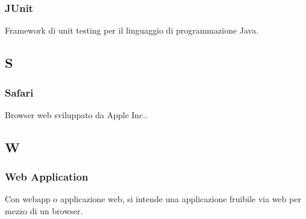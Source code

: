 \subsubsection*{JUnit}
Framework di unit testing per il linguaggio di programmazione Java.
\subsection{S}
\subsubsection*{Safari}
Browser web sviluppato da Apple Inc.. 
\subsection{W}
\subsubsection*{Web Application}
Con webapp o applicazione web, si intende una applicazione fruibile via web per mezzo di un browser.